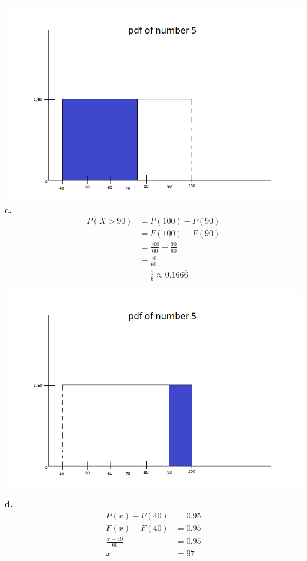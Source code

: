 \documentclass[12pt]{report}
\begin{document}
\includegraphics[scale = .7]{hw3_5b}\\

\pagebreak
\noindent \textbf{c.} 
\begin{align*}
P(X > 90) &= P(100) - P(90)\\
&= F(100) - F(90)\\
&= \frac{100}{60} - \frac{90}{60}\\
&= \frac{10}{60} \\
&= \boxed{\frac{1}{6} \approx 0.166\overline{6}}
\end{align*}

\includegraphics[scale = .7]{hw3_5c}

\pagebreak
\noindent \textbf{d.} 
\begin{align*}
P(x) - P(40) &= 0.95\\
F(x) - F(40) &= 0.95\\
\frac{x-40}{60} &= 0.95\\
x &= \boxed{97}
\end{align*}
\end{document}
